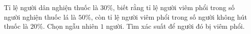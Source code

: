 \begin{ex}
Tỉ lệ người dân nghiện thuốc là $30\%$, biết rằng tỉ lệ người viêm phổi trong số người nghiện thuốc lá là $50\%$, còn tỉ lệ người viêm phổi trong số người không hút thuốc là $20\%$. Chọn ngẫu nhiên $1$ người. Tìm xác suất để người đó bị viêm phổi.
\end{ex}
